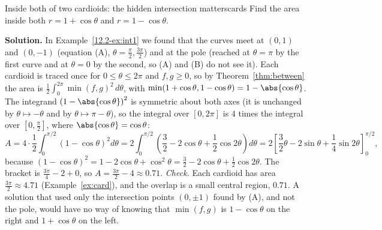 \documentclass[11pt]{article}
\begin{document}
\begin{exmp}{Inside both of two cardioids: the hidden intersection matters}{cards}
Find the area inside both $r=1+\cos\theta$ and $r=1-\cos\theta$.

\textbf{Solution.} In Example~\ref{12.2-ex:int1} we found that the curves meet at $(0,1)$ and $(0,-1)$ (equation (A), $\theta=\frac\pi2,\frac{3\pi}2$) and at the pole (reached at $\theta=\pi$ by the first curve and at $\theta=0$ by the second, so (A) and (B) do not see it). Each cardioid is traced once for $0\le\theta\le2\pi$ and $f,g\ge0$, so by Theorem~\ref{thm:between} the area is $\frac12\int_0^{2\pi}\min(f,g)^2\,d\theta$, with $\min(1+\cos\theta,1-\cos\theta)=1-\abs{\cos\theta}$. The integrand $\left(1-\abs{\cos\theta}\right)^2$ is symmetric about both axes (it is unchanged by $\theta\mapsto-\theta$ and by $\theta\mapsto\pi-\theta$), so the integral over $[0,2\pi]$ is $4$ times the integral over $\left[0,\frac\pi2\right]$, where $\abs{\cos\theta}=\cos\theta$:
\[A=4\cdot\frac12\int_0^{\pi/2}(1-\cos\theta)^2d\theta=2\int_0^{\pi/2}\left(\frac32-2\cos\theta+\frac12\cos2\theta\right)d\theta=2\left[\frac32\theta-2\sin\theta+\frac14\sin2\theta\right]_0^{\pi/2},\]
because $(1-\cos\theta)^2=1-2\cos\theta+\cos^2\theta=\frac32-2\cos\theta+\frac12\cos2\theta$. The bracket is $\frac{3\pi}4-2+0$, so $A=\frac{3\pi}2-4\approx0.71$.
\emph{Check.} Each cardioid has area $\frac{3\pi}2\approx4.71$ (Example~\ref{ex:card}), and the overlap is a small central region, $0.71$. A solution that used only the intersection points $(0,\pm1)$ found by (A), and not the pole, would have no way of knowing that $\min(f,g)$ is $1-\cos\theta$ on the right and $1+\cos\theta$ on the left.


\end{exmp}
\end{document}

